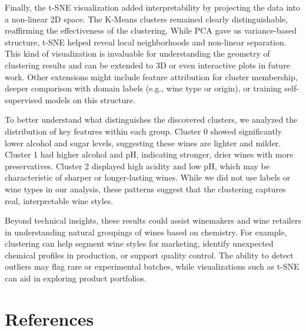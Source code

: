 \documentclass[12pt]{article}
\begin{document}
Finally, the t-SNE visualization added interpretability by projecting the data into a non-linear 2D space. The K-Means clusters remained clearly distinguishable, reaffirming the effectiveness of the clustering. While PCA gave us variance-based structure, t-SNE helped reveal local neighborhoods and non-linear separation. This kind of visualization is invaluable for understanding the geometry of clustering results and can be extended to 3D or even interactive plots in future work. Other extensions might include feature attribution for cluster membership, deeper comparison with domain labels (e.g., wine type or origin), or training self-supervised models on this structure.

To better understand what distinguishes the discovered clusters, we analyzed the distribution of key features within each group. Cluster 0 showed significantly lower alcohol and sugar levels, suggesting these wines are lighter and milder. Cluster 1 had higher alcohol and pH, indicating stronger, drier wines with more preservatives. Cluster 2 displayed high acidity and low pH, which may be characteristic of sharper or longer-lasting wines. While we did not use labels or wine types in our analysis, these patterns suggest that the clustering captures real, interpretable wine styles. 

Beyond technical insights, these results could assist winemakers and wine retailers in understanding natural groupings of wines based on chemistry. For example, clustering can help segment wine styles for marketing, identify unexpected chemical profiles in production, or support quality control. The ability to detect outliers may flag rare or experimental batches, while visualizations such as t-SNE can aid in exploring product portfolios.


\section*{References}
\end{document}

